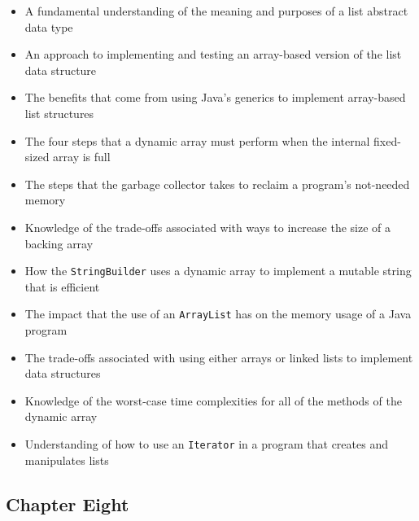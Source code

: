 \documentclass[11pt]{article}
\newcommand{\program}[1]{\lstinline{#1}}
\begin{document}
\begin{itemize}

  \setlength{\itemsep}{0.05in}

  \item A fundamental understanding of the meaning and purposes of a list
    abstract data type

  \item An approach to implementing and testing an array-based version of the
    list data structure

  \item The benefits that come from using Java's generics to implement
    array-based list structures

  \item The four steps that a dynamic array must perform when the internal
    fixed-sized array is full

  \item The steps that the garbage collector takes to reclaim a program's
    not-needed memory

  \item Knowledge of the trade-offs associated with ways to increase the size of
    a backing array

  \item How the \program{StringBuilder} uses a dynamic array to implement
    a mutable string that is efficient

  \item The impact that the use of an \program{ArrayList} has on the memory
    usage of a Java program

  \item The trade-offs associated with using either arrays or linked lists to
    implement data structures

  \item Knowledge of the worst-case time complexities for all of the methods
    of the dynamic array

  \item Understanding of how to use an \program{Iterator} in a program that
    creates and manipulates lists


\end{itemize}

\subsection*{Chapter Eight}
\end{document}
